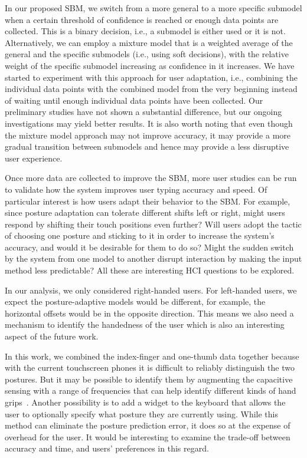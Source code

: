 \documentclass{sigchi}
\begin{document}
In our proposed SBM, we switch from a more general to a more specific submodel
when a certain threshold of confidence is reached or enough data points are
collected. This is a binary decision, i.e., a submodel is either used or it is not.
Alternatively,
we can employ a mixture model that is a weighted average of
the general and the specific submodels (i.e., using soft decisions), with the
relative weight of the specific submodel increasing as confidence in it increases. We have started to experiment with this approach for user adaptation,
i.e., combining the individual data points with the combined model from the very beginning instead
of waiting until enough individual data points have been collected. Our preliminary studies have not shown a substantial difference, but our ongoing investigations may yield better results.
It is also worth noting that even though the mixture model approach may not
improve accuracy, it may provide a more gradual transition between submodels
and hence may provide a less disruptive user experience. 

Once more data are collected to improve the SBM, more user studies can be run to validate how the system improves user typing
accuracy and speed. Of particular interest is how users
adapt their behavior to the SBM. For example, since posture adaptation
can tolerate different shifts left or right, might users respond by shifting their touch positions even further? Will users adopt the
tactic of choosing one posture and sticking to it in order to increase the system's
accuracy, and would it be desirable for them to do so? Might the sudden switch
by the system from one model to another disrupt interaction by making the input 
method less predictable? All these are interesting HCI questions to be explored.

In our analysis, we only considered right-handed users. For left-handed users,
we expect the posture-adaptive models would be different, for example, the
horizontal offsets would be in the opposite direction. This means we also
need a mechanism to identify the handedness of the user which is also an
interesting aspect of the future work.

In this work, we
combined the index-finger and one-thumb data together because with the current touchscreen phones it is difficult to reliably distinguish the two postures. But it may be possible to identify them by augmenting the
capacitive sensing with a range of frequencies that can help identify different kinds of 
hand grips~\cite{Sato:2012}. Another possibility is to add a widget to the
keyboard that allows the user to optionally specify what posture they are
currently using. While this method can eliminate the posture
prediction error, it does so at the expense of overhead for the user. It would be interesting
to examine the trade-off between accuracy and time,
and users' preferences in this regard.
\end{document}

